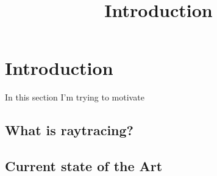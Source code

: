 \chapter{Introduction} %
\label{cha:introduction} %

\title{Introduction}
In this section I'm trying to motivate 

\section{What is raytracing?}

\newpage

\section{Current state of the Art}

